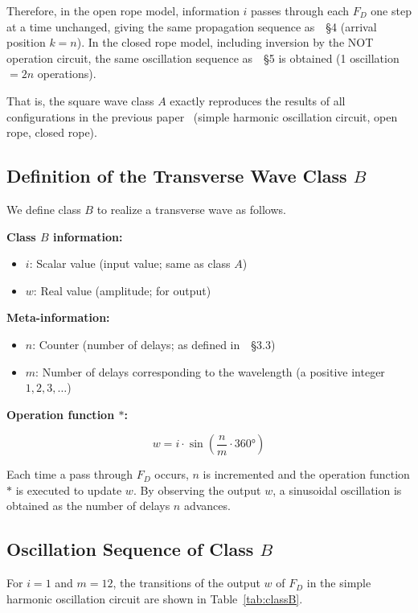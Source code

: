 \documentclass[12pt,a4paper]{article}
\begin{document}
Therefore, in the open rope model, information $i$ passes through each $F_D$ one step at a
time unchanged, giving the same propagation sequence as~\cite{ref1}~\S4 (arrival position
$k = n$). In the closed rope model, including inversion by the NOT operation circuit, the same
oscillation sequence as~\cite{ref1}~\S5 is obtained (1 oscillation $= 2n$ operations).

That is, the square wave class $A$ exactly reproduces the results of all configurations in
the previous paper~\cite{ref1} (simple harmonic oscillation circuit, open rope, closed rope).

\subsection{Definition of the Transverse Wave Class $B$}

We define class $B$ to realize a transverse wave as follows.

\textbf{Class $B$ information:}
\begin{itemize}
  \item $i$: Scalar value (input value; same as class $A$)
  \item $w$: Real value (amplitude; for output)
\end{itemize}

\textbf{Meta-information:}
\begin{itemize}
  \item $n$: Counter (number of delays; as defined in~\cite{ref2}~\S3.3)
  \item $m$: Number of delays corresponding to the wavelength (a positive integer
        $1, 2, 3, \ldots$)
\end{itemize}

\textbf{Operation function $*$:}

\begin{equation}
  w = i \cdot \sin\!\left(\frac{n}{m} \cdot 360°\right)
\end{equation}

Each time a pass through $F_D$ occurs, $n$ is incremented and the operation function $*$ is
executed to update $w$. By observing the output $w$, a sinusoidal oscillation is obtained as
the number of delays $n$ advances.

\subsection{Oscillation Sequence of Class $B$}

For $i = 1$ and $m = 12$, the transitions of the output $w$ of $F_D$ in the simple harmonic
oscillation circuit are shown in Table~\ref{tab:classB}.
\end{document}
